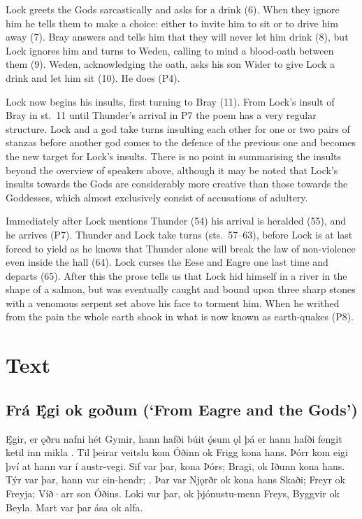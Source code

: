 Lock greets the Gods sarcastically and asks for a drink (6).  When they ignore him he tells them to make a choice: either to invite him to sit or to drive him away (7).  Bray answers and tells him that they will never let him drink (8), but Lock ignores him and turns to Weden, calling to mind a blood-oath between them (9).  Weden, acknowledging the oath, asks his son Wider to give Lock a drink and let him sit (10).  He does (P4).

Lock now begins his insults, first turning to Bray (11).  From Lock’s insult of Bray in st.~11 until Thunder’s arrival in P7 the poem has a very regular structure.  Lock and a god take turns insulting each other for one or two pairs of stanzas before another god comes to the defence of the previous one and becomes the new target for Lock’s insults.  There is no point in summarising the insults beyond the overview of speakers above, although it may be noted that Lock’s insults towards the Gods are considerably more creative than those towards the Goddesses, which almost exclusively consist of accusations of adultery.

Immediately after Lock mentions Thunder (54) his arrival is heralded (55), and he arrives (P7).  Thunder and Lock take turns (sts.~57--63), before Lock is at last forced to yield as he knows that Thunder alone will break the law of non-violence even inside the hall (64).  Lock curses the Eese and Eagre one last time and departs (65).  After this the prose tells us that Lock hid himself in a river in the shape of a salmon, but was eventually caught and bound upon three sharp stones with a venomous serpent set above his face to torment him.  When he writhed from the pain the whole earth shook in what is now known as earth-quakes (P8).

\newpage

\section{Text}

\subsection{Frá Ę́gi ok goðum (‘From Eagre and the Gods’)}

\bpg\bpa Ę́gir, er ǫðru nafni hét Gymir, hann hafði búit ǫ́sum ǫl þá er hann hafði fengit ketil inn mikla .  Til þeirar veitslu kom Óðinn ok Frigg kona hans. Þórr kom eigi því at hann var í austr-vegi. Sif var þar, kona Þórs; Bragi, ok Iðunn kona hans. Týr var þar, hann var ein-hendr; .  Þar var Njǫrðr ok kona hans Skaði; Freyr ok Freyja; Víð·arr son Óðins. Loki var þar, ok þjónustu-menn Freys, Byggvir ok Beyla. Mart var þar ása ok alfa.\epa

